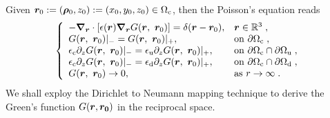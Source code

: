 Given $\bm{r}_0:=(\bm{\rho}_0,z_0):=(x_0, y_0, z_0)\in\Omega_{\mathrm{c}}$,  then the   Poisson's equation reads 
\begin{equation}\label{eq...text...RepPoisson}
    \left \{
    \begin{array}{ll}
        - \boldsymbol{\nabla}_{\boldsymbol{r}} \cdot\left[ \epsilon(\boldsymbol{r}) \boldsymbol{\nabla}_{\boldsymbol{r}} G(\boldsymbol{r},~\boldsymbol{r}_0) \right] = \delta (\boldsymbol{r} - \boldsymbol{r}_0), & \boldsymbol{r} \in \mathbb{R}^3 \;, \\
        G(\boldsymbol{r},~\boldsymbol{r}_0) |_{-} = G(\boldsymbol{r},~\boldsymbol{r}_0) |_{+}, & \text{on}~\partial\Omega_{\mathrm{c}}\;, \\
        \epsilon_{\mathrm{c}} \partial_{z} G(\boldsymbol{r},~\boldsymbol{r}_0) |_{-} = \epsilon_{\mathrm{u}} \partial_{z} G(\boldsymbol{r},~\boldsymbol{r}_0) |_{+}, & \text{on}~\partial \Omega_{\mathrm{c}} \cap \partial \Omega_{\mathrm{u}}\;,     \\
\epsilon_{\mathrm{c}} \partial_{z} G(\boldsymbol{r},~\boldsymbol{r}_0) |_{-} = \epsilon_{\mathrm{d}} \partial_{z} G(\boldsymbol{r},~\boldsymbol{r}_0) |_{+}, & \text{on}~\partial \Omega_{\mathrm{c}} \cap \partial \Omega_{\mathrm{d}}\;,\\
G(\boldsymbol{r},~\boldsymbol{r}_0) \to 0, & \text{as}~{r} \to \infty\;.
\end{array}\right.
\end{equation}
We shall exploy   the Dirichlet to Neumann mapping technique to derive  the Green's function  $G(\boldsymbol{r}, \boldsymbol{r_0})$    in the reciprocal space. 
